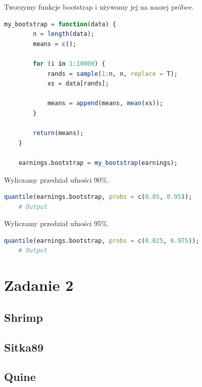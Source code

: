 \documentclass[11pt]{article}
\begin{document}
\pagebreak

Tworzymy funkcje bootstrap i używamy jej na naszej próbce.

\begin{lstlisting}[language=R]
    my_bootstrap = function(data) {
        n = length(data);
        means = c();

        for (i in 1:10000) {
            rands = sample(1:n, n, replace = T);
            xs = data[rands];

            means = append(means, mean(xs));
        }

        return(means);
    }

    earnings.bootstrap = my_bootstrap(earnings);
\end{lstlisting}

Wyliczamy przedział ufności 90\%.

\begin{lstlisting}[language=R]
    quantile(earnings.bootstrap, probs = c(0.05, 0.95));
    # Output
\end{lstlisting}

Wyliczamy przedział ufności 95\%.

\begin{lstlisting}[language=R]
    quantile(earnings.bootstrap, probs = c(0.025, 0.975));
    # Output
\end{lstlisting}

\pagebreak

\section{Zadanie 2}

\subsection{Shrimp}

\subsection{Sitka89}

\subsection{Quine}
\end{document}
